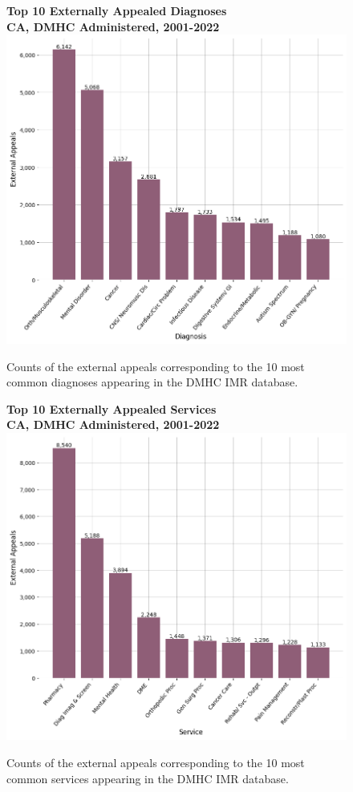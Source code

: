 \documentclass[12pt, a4paper,twoside,parskip=full]{report}
\theoremstyle{plain} %
\theoremstyle{definition} %
\theoremstyle{remark} %
\numberwithin{equation}{chapter}
\begin{document}
		\begin{figure}[h!]
			\centering
			\textbf{Top 10 Externally Appealed Diagnoses}\\
			\textbf{CA, DMHC Administered, 2001-2022}\\
			\includegraphics[width=.8\textwidth]{images/ca_dmhc_external_appeals/top_externally_appealed_diagnoses.png}
			\caption{Counts of the external appeals corresponding to the 10 most common diagnoses appearing in the DMHC IMR database.}
			\label{cadmhcexternalappealsbydiagnosis}
		\end{figure}
	\clearpage
		
		
		\begin{figure}[h!]
			\centering
			\textbf{Top 10 Externally Appealed Services}\\
			\textbf{CA, DMHC Administered, 2001-2022}\\
			\includegraphics[width=.8\textwidth]{images/ca_dmhc_external_appeals/top_externally_appealed_treatments.png}
			\caption{Counts of the external appeals corresponding to the 10 most common services appearing in the DMHC IMR database.}
			\label{cadmhcexternalappealsbyservice}
		\end{figure}
	\clearpage
		
\end{document}
